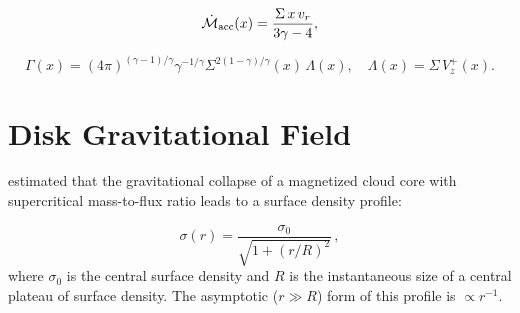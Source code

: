 \documentclass[twocolumn,linenumbers]{aastex631}
\begin{document}
\begin{equation}
\dot{\mathcal{M}}_{\rm acc}(x) = \frac{\Sigma\, x\, v_{r}}{3\gamma - 4},
\end{equation}

\begin{equation}
\Gamma(x) = (4\pi)^{(\gamma - 1)/\gamma} \gamma^{-1/\gamma} \Sigma^{2(1-\gamma)/\gamma}(x) \,\Lambda(x), \quad \Lambda(x) = \Sigma\, V_{z}^{+}(x)
\label{a19}.
\end{equation}

\section{Disk Gravitational Field}
\label{app2}

\citet{basu1997} estimated that the gravitational collapse of a magnetized cloud core with supercritical mass-to-flux ratio leads to a surface density profile:

\begin{equation}
\sigma(r) = \frac{\sigma_0}{\sqrt{1 + (r/R)^2}} \, ,
\label{b1}
\end{equation}
where $\sigma_0$ is the central surface density and $R$ is the instantaneous size of a central plateau of surface density. The asymptotic ($r \gg R$) form of this profile is $\propto r^{-1}$.
\end{document}
